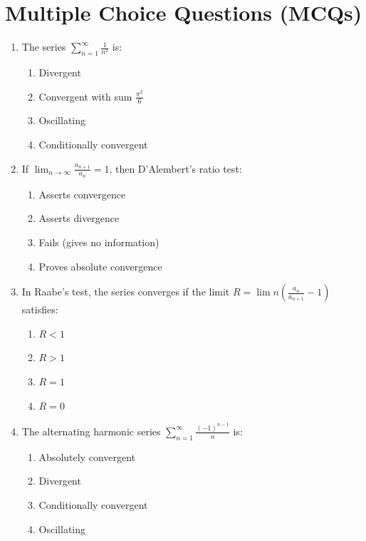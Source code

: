 \section{Multiple Choice Questions (MCQs)}

\begin{enumerate}[leftmargin=1.5em]
    \item The series $\sum_{n=1}^\infty \frac{1}{n^2}$ is:
    \begin{enumerate}[label=(\alph*)]
        \item Divergent
        \item Convergent with sum $\frac{\pi^2}{6}$
        \item Oscillating
        \item Conditionally convergent
    \end{enumerate}

    \item If $\lim_{n\to\infty} \frac{a_{n+1}}{a_n} = 1$, then D'Alembert's ratio test:
    \begin{enumerate}[label=(\alph*)]
        \item Asserts convergence
        \item Asserts divergence
        \item Fails (gives no information)
        \item Proves absolute convergence
    \end{enumerate}

    \item In Raabe's test, the series converges if the limit $R = \lim n\left(\frac{a_n}{a_{n+1}}-1\right)$ satisfies:
    \begin{enumerate}[label=(\alph*)]
        \item $R < 1$
        \item $R > 1$
        \item $R = 1$
        \item $R = 0$
    \end{enumerate}

    \item The alternating harmonic series $\sum_{n=1}^\infty \frac{(-1)^{n-1}}{n}$ is:
    \begin{enumerate}[label=(\alph*)]
        \item Absolutely convergent
        \item Divergent
        \item Conditionally convergent
        \item Oscillating
    \end{enumerate}


\end{enumerate}
